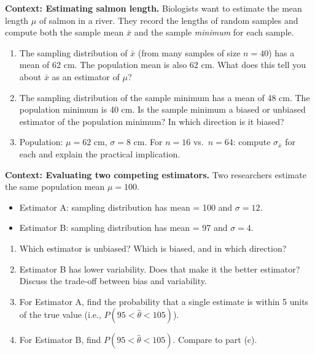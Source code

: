 \documentclass[10pt]{article}
\begin{document}
\begin{tcolorbox}[colback=redbg, colframe=black!40, boxrule=0.6pt, arc=2mm,
    left=3mm, right=3mm, top=2mm, bottom=2mm, title=\textbf{Tier A --- Approaching Proficiency}]
\textbf{Context: Estimating salmon length.}
Biologists want to estimate the mean length $\mu$ of salmon in a river. They record the
lengths of random samples and compute both the sample mean $\bar{x}$ and the sample
\emph{minimum} for each sample.

\begin{enumerate}
  \item The sampling distribution of $\bar{x}$ (from many samples of size $n = 40$) has a
        mean of 62 cm. The population mean is also 62 cm. What does this tell you about
        $\bar{x}$ as an estimator of $\mu$?
  \item The sampling distribution of the sample minimum has a mean of 48 cm. The population
        minimum is 40 cm. Is the sample minimum a biased or unbiased estimator of the
        population minimum? In which direction is it biased?
  \item Population: $\mu = 62$ cm, $\sigma = 8$ cm. For $n = 16$ vs.\ $n = 64$:
        compute $\sigma_{\bar{x}}$ for each and explain the practical implication.
        \vspace{0.8in}
\end{enumerate}
\end{tcolorbox}

\vspace{0.12in}

\begin{tcolorbox}[colback=redbg, colframe=black!40, boxrule=0.6pt, arc=2mm,
    left=3mm, right=3mm, top=2mm, bottom=2mm, title=\textbf{Tier E --- Extension}]
\textbf{Context: Evaluating two competing estimators.}
Two researchers estimate the same population mean $\mu = 100$.
\begin{itemize}
  \item Estimator A: sampling distribution has mean = 100 and $\sigma = 12$.
  \item Estimator B: sampling distribution has mean = 97 and $\sigma = 4$.
\end{itemize}

\begin{enumerate}
  \item Which estimator is unbiased? Which is biased, and in which direction?
  \item Estimator B has lower variability. Does that make it the better estimator?
        Discuss the trade-off between bias and variability.
  \item For Estimator A, find the probability that a single estimate is within 5 units
        of the true value (i.e., $P(95 < \hat{\theta} < 105)$).
        \vspace{0.8in}
  \item For Estimator B, find $P(95 < \hat{\theta} < 105)$. Compare to part (c).
        \vspace{0.8in}
\end{enumerate}
\end{tcolorbox}
\end{document}
